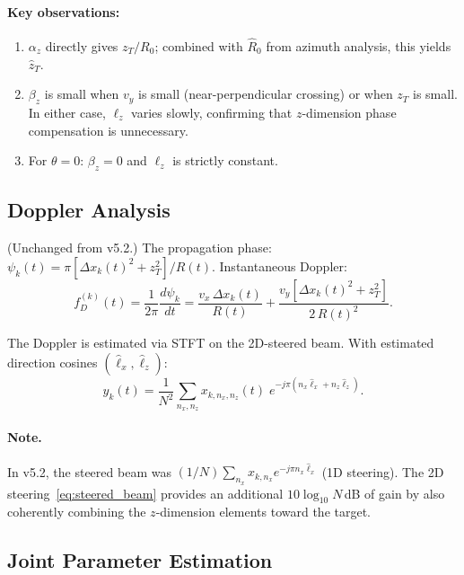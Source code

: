 \documentclass[11pt,a4paper]{article}
\begin{document}
\paragraph{Key observations:}
\begin{enumerate}
  \item $\alpha_z$ directly gives $z_T/R_0$; combined with
    $\hat{R}_0$ from azimuth analysis, this yields $\hat{z}_T$.
  \item $\beta_z$ is small when $v_y$ is small (near-perpendicular
    crossing) or when $z_T$ is small.  In either case, $\ell_z$
    varies slowly, confirming that $z$-dimension phase compensation
    is unnecessary.
  \item For $\theta=0$: $\beta_z=0$ and $\ell_z$ is strictly
    constant.
\end{enumerate}

\subsection{Doppler Analysis}
\label{sec:doppler}

(Unchanged from v5.2.)
The propagation phase:
$\psi_k(t)=\pi[\Delta x_k(t)^2+z_T^2]/R(t)$.  Instantaneous
Doppler:
\begin{equation}
  f_D^{(k)}(t) = \frac{1}{2\pi}\frac{d\psi_k}{dt}
  = \frac{v_x\,\Delta x_k(t)}{R(t)}
  + \frac{v_y[\Delta x_k(t)^2+z_T^2]}{2\,R(t)^2}.
  \label{eq:doppler_full}
\end{equation}

The Doppler is estimated via STFT on the 2D-steered beam.  With
estimated direction cosines $(\hat{\ell}_x,\hat{\ell}_z)$:
\begin{equation}
  y_k(t) = \frac{1}{N^2}\sum_{n_x,n_z}
  x_{k,n_x,n_z}(t)\;e^{-j\pi(n_x\hat{\ell}_x+n_z\hat{\ell}_z)}.
  \label{eq:steered_beam}
\end{equation}

\paragraph{Note.}
In v5.2, the steered beam was
$(1/N)\sum_{n_x}x_{k,n_x}e^{-j\pi n_x\hat{\ell}_x}$ (1D steering).
The 2D steering~\eqref{eq:steered_beam} provides an additional
$10\log_{10}N$\,dB of gain by also coherently combining the
$z$-dimension elements toward the target.

\subsection{Joint Parameter Estimation}
\label{sec:joint_zone_b}
\end{document}
